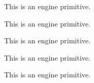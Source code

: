 \begin{function}[]
  {
    \ifin@
  }
  \begin{syntax}
  \end{syntax}

\end{function}



\begin{function}[]
  {
    \ifincsname
  }
  \begin{syntax}
  \end{syntax}
  This is an engine primitive.
\end{function}



\begin{function}[]
  {
    \ifinner
  }
  \begin{syntax}
  \end{syntax}
  This is an engine primitive.
\end{function}



\begin{function}[]
  {
    \ifmaybe@ic
  }
  \begin{syntax}
  \end{syntax}

\end{function}



\begin{function}[]
  {
    \ifmmode
  }
  \begin{syntax}
  \end{syntax}
  This is an engine primitive.
\end{function}



\begin{function}[]
  {
    \ifnum
  }
  \begin{syntax}
  \end{syntax}
  This is an engine primitive.
\end{function}



\begin{function}[]
  {
    \ifodd
  }
  \begin{syntax}
  \end{syntax}
  This is an engine primitive.
\end{function}




